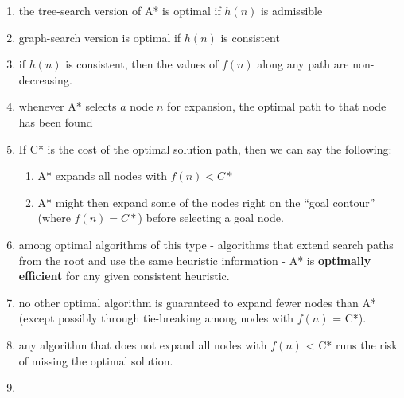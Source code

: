 \begin{enumerate}
    \item the tree-search version of A* is optimal if $h(n)$ is admissible

    \item graph-search version is optimal if $h(n)$ is consistent

    \item if $h(n)$ is consistent, then the values of $f(n)$ along any path are non-decreasing.

    \item whenever A* selects $a$ node $n$ for expansion, the optimal path to that node has been found

    \item If C* is the cost of the optimal solution path, then we can say the following:
    \begin{enumerate}
        \item A* expands all nodes with $f(n) < C*$

        \item A* might then expand some of the nodes right on the “goal contour” (where $f(n) = C*$) before selecting a goal node.
    \end{enumerate}

    \item among optimal algorithms of this type - algorithms that extend search paths from the root and use the same heuristic information - A* is \textbf{optimally efficient} for any given consistent heuristic.

    \item no other optimal algorithm is guaranteed to expand fewer nodes than A* (except possibly through tie-breaking among nodes with $f(n)$ = C*). 
    
    \item any algorithm that does not expand all nodes with $f(n)$ < C* runs the risk of missing the optimal solution.

    \item 
\end{enumerate}

















